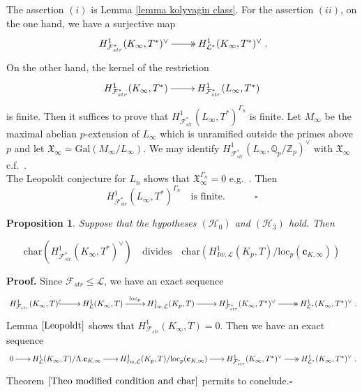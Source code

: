 \documentclass[reqno]{amsart}
\newcounter{dummy} \numberwithin{dummy}{section}
\newtheorem{pro}[dummy]{Proposition}
\begin{document}
The assertion $(i)$ is Lemma \ref{lemma kolyvagin class}. For the
assertion $(ii)$, on the one hand, we have a surjective map
$$
\xymatrix@=2pc{
H^{1}_{\mathcal{F}_{str}^{\ast}}(K_{\infty},T^{\ast})^{\vee}\ar@{->>}[r]&
H^{1}_{\mathcal{L}^{\ast}}(K_{\infty},T^{\ast})^{\vee}}.
$$
On the other hand, the kernel of the restriction
$$
\xymatrix@=2pc{
H^{1}_{\mathcal{F}_{str}^{\ast}}(K_{\infty},T^{\ast})\ar[r]&
H^{1}_{\mathcal{F}_{str}^{\ast}}(L_{\infty},T^{\ast})}
$$
is finite. Then  it suffices to prove that
$H^{1}_{\mathcal{F}_{str}^{\ast}}(L_{\infty},T^{\ast})^{\Gamma_{n}}$
is finite. Let $M_{\infty}$ be the maximal abelian $p$-extension of
$L_{\infty}$ which is unramified outside the primes above $p$ and
let $\mathfrak{X}_{\infty}=\mathrm{Gal}(M_{\infty}/L_{\infty})$. We
may identify
$H^{1}_{\mathcal{F}_{str}^{\ast}}(L_{\infty},\mathbb{Q}_{p}/\mathbb{Z}_{p})^{\vee}$
with  $\mathfrak{X}_{\infty}$ c.f.\, \cite[\S I.6.3]{Rubin00}.\\
 The Leopoldt conjecture
for $L_{n}$ shows that $\mathfrak{X}_{\infty}^{\Gamma_{n}}=0 $
e.g.\, \cite[Proposition 11.3.3]{NSW91}. Then
$$
H^{1}_{\mathcal{F}_{str}^{\ast}}(L_{\infty},T^{\ast})^{\Gamma_{n}}\quad\mbox{is
finite}.\quad\quad\quad \square
$$
\begin{pro}\label{pro Euler system and strict condition} Suppose
that the hypotheses $(\mathcal{H}_{0})$ and $(\mathcal{H}_{3})$
hold.
 Then

$$
\mathrm{char}(H^{1}_{\mathcal{F}_{str}^{\ast}}(K_{\infty},T^{\ast})^{\vee})\quad\mbox{divides}\quad
\mathrm{char}(H^{1}_{Iw,\mathcal{L}}(K_{p},T)/\mathrm{loc}_{p}(\mathbf{c}_{K,\infty}))
$$
\end{pro}
\noindent \textbf{Proof.} Since $\mathcal{F}_{str}\leq \mathcal{L}$,
we have an exact sequence
$$
\xymatrix@=2pc{
H^{1}_{\mathcal{F}_{str}}(K_{\infty},T)\ar@{^{(}->}[r]&
H^{1}_{\mathcal{L}}(K_{\infty},T)\ar[r]^-{\mathrm{loc}_{p}}&
H^{1}_{Iw,\mathcal{L}}(K_{p},T)\ar[r]&
H^{1}_{\mathcal{F}_{str}^{\ast}}(K_{\infty},T^{\ast})^{\vee}\ar@{->>}[r]&
H^{1}_{\mathcal{L}^{\ast}}(K_{\infty},T^{\ast})^{\vee}}.
$$
 Lemma $\ref{Leopoldt}$ shows that
 $H^{1}_{\mathcal{F}_{str}}(K_{\infty},T)=0$. Then we have an exact sequence
$$
\xymatrix@=1.5pc{
0\ar[r]&H^{1}_{\mathcal{L}}(K_{\infty},T)/\Lambda.\mathbf{c}_{K,\infty}\ar[r]
&H^{1}_{Iw,\mathcal{L}}(K_{p},T)/\mathrm{loc}_{p}(\mathbf{c}_{K,\infty})\ar[r]&
H^{1}_{\mathcal{F}_{str}^{\ast}}(K_{\infty},T^{\ast})^{\vee}\ar@{->>}[r]&
H^{1}_{\mathcal{L}^{\ast}}(K_{\infty},T^{\ast})^{\vee}}.
$$
Theorem $\ref{Theo modified condition and char}$ permits to
conclude.\hfill $\square$\vskip 6pt
\end{document}
